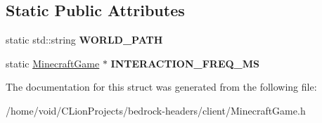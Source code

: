 \subsection*{Static Public Attributes}
\begin{DoxyCompactItemize}
\item 
\mbox{\label{struct_minecraft_game_a62d2f7d5ee9cb70ca7fe4c7dbd1fe790}} 
static std\+::string {\bfseries W\+O\+R\+L\+D\+\_\+\+P\+A\+TH}
\item 
\mbox{\label{struct_minecraft_game_a02e189e70a3bef2ac0b38e78b86e3f00}} 
static \mbox{\hyperlink{struct_minecraft_game}{Minecraft\+Game}} $\ast$ {\bfseries I\+N\+T\+E\+R\+A\+C\+T\+I\+O\+N\+\_\+\+F\+R\+E\+Q\+\_\+\+MS}
\end{DoxyCompactItemize}


The documentation for this struct was generated from the following file\+:\begin{DoxyCompactItemize}
\item 
/home/void/\+C\+Lion\+Projects/bedrock-\/headers/client/Minecraft\+Game.\+h\end{DoxyCompactItemize}
